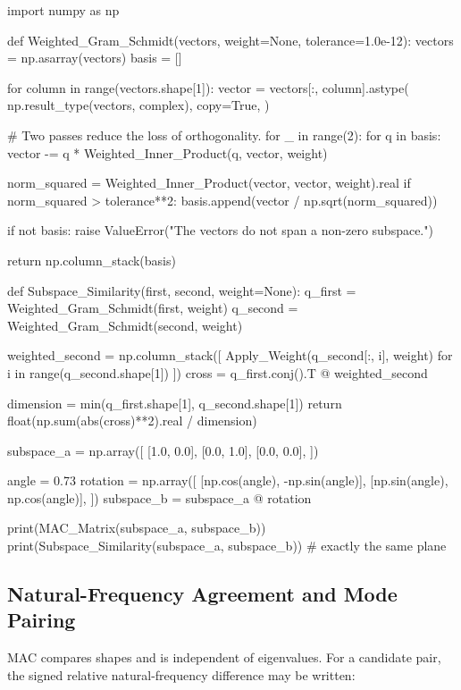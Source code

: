 \begin{python}
import numpy as np


def Weighted_Gram_Schmidt(vectors, weight=None, tolerance=1.0e-12):
    vectors = np.asarray(vectors)
    basis = []

    for column in range(vectors.shape[1]):
        vector = vectors[:, column].astype(
            np.result_type(vectors, complex),
            copy=True,
        )

        # Two passes reduce the loss of orthogonality.
        for _ in range(2):
            for q in basis:
                vector -= q * Weighted_Inner_Product(q, vector, weight)

        norm_squared = Weighted_Inner_Product(vector, vector, weight).real
        if norm_squared > tolerance**2:
            basis.append(vector / np.sqrt(norm_squared))

    if not basis:
        raise ValueError("The vectors do not span a non-zero subspace.")

    return np.column_stack(basis)


def Subspace_Similarity(first, second, weight=None):
    q_first = Weighted_Gram_Schmidt(first, weight)
    q_second = Weighted_Gram_Schmidt(second, weight)

    weighted_second = np.column_stack([
        Apply_Weight(q_second[:, i], weight)
        for i in range(q_second.shape[1])
    ])
    cross = q_first.conj().T @ weighted_second

    dimension = min(q_first.shape[1], q_second.shape[1])
    return float(np.sum(abs(cross)**2).real / dimension)


subspace_a = np.array([
    [1.0, 0.0],
    [0.0, 1.0],
    [0.0, 0.0],
])

angle = 0.73
rotation = np.array([
    [np.cos(angle), -np.sin(angle)],
    [np.sin(angle),  np.cos(angle)],
])
subspace_b = subspace_a @ rotation

print(MAC_Matrix(subspace_a, subspace_b))
print(Subspace_Similarity(subspace_a, subspace_b))  # exactly the same plane
\end{python}

\subsection{Natural-Frequency Agreement and Mode Pairing}

MAC compares shapes and is independent of eigenvalues. For a candidate pair,
the signed relative natural-frequency difference may be written:

